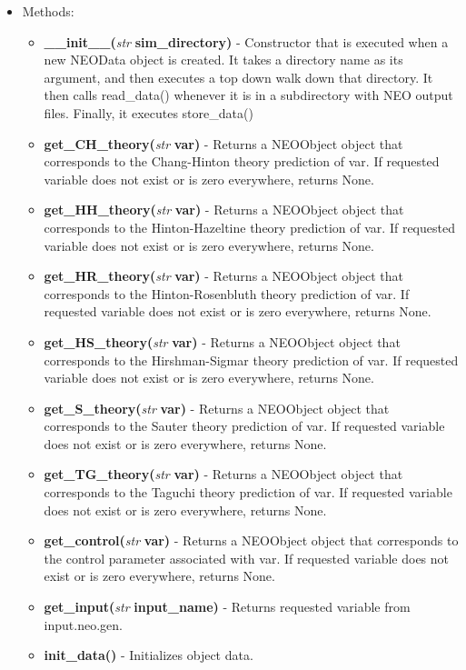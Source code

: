 \documentclass{article}
\begin{document}
\begin{itemize}
\begin{itemize}
\end{itemize}
\item Methods:
\begin{itemize}
\item \textbf{\_\_init\_\_(}\emph{str} \textbf{sim\_directory)} - Constructor that is executed when a new NEOData object is created.  It takes a directory name as its argument, and then executes a top down walk down that directory.  It then calls read\_data() whenever it is in a subdirectory with NEO output files.  Finally, it executes store\_data()
\item \textbf{get\_CH\_theory(}\emph{str} \textbf{var)} - Returns a NEOObject object that corresponds to the Chang-Hinton theory prediction of var.  If requested variable does not exist or is zero everywhere, returns None.
\item \textbf{get\_HH\_theory(}\emph{str} \textbf{var)} - Returns a NEOObject object that corresponds to the Hinton-Hazeltine theory prediction of var.  If requested variable does not exist or is zero everywhere, returns None.
\item \textbf{get\_HR\_theory(}\emph{str} \textbf{var)} - Returns a NEOObject object that corresponds to the Hinton-Rosenbluth theory prediction of var.  If requested variable does not exist or is zero everywhere, returns None.
\item \textbf{get\_HS\_theory(}\emph{str} \textbf{var)} - Returns a NEOObject object that corresponds to the Hirshman-Sigmar theory prediction of var.  If requested variable does not exist or is zero everywhere, returns None.
\item \textbf{get\_S\_theory(}\emph{str} \textbf{var)} - Returns a NEOObject object that corresponds to the Sauter theory prediction of var.  If requested variable does not exist or is zero everywhere, returns None.
\item \textbf{get\_TG\_theory(}\emph{str} \textbf{var)} - Returns a NEOObject object that corresponds to the Taguchi theory prediction of var.  If requested variable does not exist or is zero everywhere, returns None.
\item \textbf{get\_control(}\emph{str} \textbf{var)} - Returns a NEOObject object that corresponds to the control parameter associated with var.  If requested variable does not exist or is zero everywhere, returns None.
\item \textbf{get\_input(}\emph{str} \textbf{input\_name)} - Returns requested variable from input.neo.gen.
\item \textbf{init\_data()} - Initializes object data.

\end{itemize}
\end{itemize}
\end{document}

